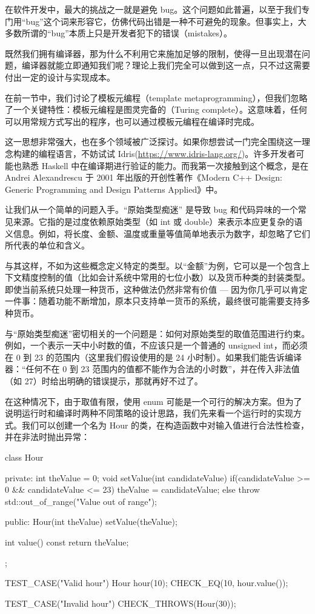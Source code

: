 

在软件开发中，最大的挑战之一就是避免 bug。这个问题如此普遍，以至于我们专门用“bug”这个词来形容它，仿佛代码出错是一种不可避免的现象。但事实上，大多数所谓的“bug”本质上只是开发者犯下的错误（mistakes）。

既然我们拥有编译器，那为什么不利用它来施加足够的限制，使得一旦出现潜在问题，编译器就能立即通知我们呢？理论上我们完全可以做到这一点，只不过这需要付出一定的设计与实现成本。

在前一节中，我们讨论了模板元编程（template metaprogramming），但我们忽略了一个关键特性：模板元编程是图灵完备的（Turing complete）。这意味着，任何可以用常规方式写出的程序，也可以通过模板元编程在编译时完成。

这一思想非常强大，也在多个领域被广泛探讨。如果你想尝试一门完全围绕这一理念构建的编程语言，不妨试试 Idris(\url{https://www.idris-lang.org/})。许多开发者可能也熟悉 Haskell 中在编译期进行验证的能力。而我第一次接触到这个概念，是在 Andrei Alexandrescu 于 2001 年出版的开创性著作《Modern C++ Design: Generic Programming and Design Patterns Applied》中。

让我们从一个简单的问题入手。“原始类型痴迷” 是导致 bug 和代码异味的一个常见来源。它指的是过度依赖原始类型（如 int 或 double）来表示本应更复杂的语义信息。例如，将长度、金额、温度或重量等值简单地表示为数字，却忽略了它们所代表的单位和含义。

与其这样，不如为这些概念定义特定的类型。以“金额”为例，它可以是一个包含上下文精度控制的值（比如会计系统中常用的七位小数）以及货币种类的封装类型。即使当前系统只处理一种货币，这种做法仍然非常有价值 --- 因为你几乎可以肯定一件事：随着功能不断增加，原本只支持单一货币的系统，最终很可能需要支持多种货币。

与“原始类型痴迷”密切相关的一个问题是：如何对原始类型的取值范围进行约束。例如，一个表示一天中小时数的值，不应该只是一个普通的 unsigned int，而必须在 0 到 23 的范围内（这里我们假设使用的是 24 小时制）。如果我们能告诉编译器：“任何不在 0 到 23 范围内的值都不能作为合法的小时数”，并在传入非法值（如 27）时给出明确的错误提示，那就再好不过了。

在这种情况下，由于取值有限，使用 enum 可能是一个可行的解决方案。但为了说明运行时和编译时两种不同策略的设计思路，我们先来看一个运行时的实现方式。我们可以创建一个名为 Hour 的类，在构造函数中对输入值进行合法性检查，并在非法时抛出异常：

\begin{cpp}
class Hour{
private:
  int theValue = 0;
  void setValue(int candidateValue) {
    if(candidateValue >= 0 && candidateValue <= 23){
      theValue = candidateValue;
    }
    else{
      throw std::out_of_range("Value out of range");
    } 
  }

public:
  Hour(int theValue){
    setValue(theValue);
  }

  int value() const {
    return theValue;
  }
};

TEST_CASE("Valid hour"){
  Hour hour(10);
  CHECK_EQ(10, hour.value());
}

TEST_CASE("Invalid hour"){
  CHECK_THROWS(Hour(30));
}
\end{cpp}

